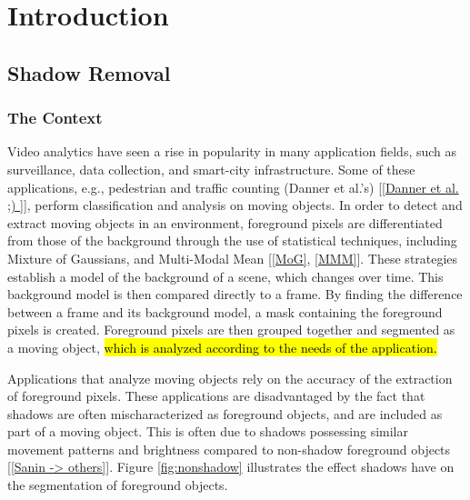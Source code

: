 \documentclass[12pt]{report}
\begin{document}
\doublespacing

\clearpage
\chapter{Introduction}

\section{Shadow Removal}

\subsection{The Context}

Video analytics have seen a rise in popularity in many application fields, such as surveillance, data collection, and smart-city infrastructure. Some of these applications, e.g., pedestrian and traffic counting (Danner et al.'s) [\ref{Danner et al. ;) }], perform classification and analysis on moving objects. In order to detect and extract moving objects in an environment, foreground pixels are differentiated from those of the background through the use of statistical techniques, including Mixture of Gaussians, and Multi-Modal Mean [\ref{MoG}, \ref{MMM}]. These strategies establish a model of the background of a scene, which changes over time. This background model is then compared directly to a frame. By finding the difference between a frame and its background model, a mask containing the foreground pixels is created. Foreground pixels are then grouped together and segmented as a moving object, \hl{which is analyzed according to the needs of the application.} 

Applications that analyze moving objects rely on the accuracy of the extraction of foreground pixels. These applications are disadvantaged by the fact that shadows are often mischaracterized as foreground objects, and are included as part of a moving object. This is often due to shadows possessing similar movement patterns and brightness compared to non-shadow foreground objects [\ref{Sanin -> others}]. Figure \ref{fig:nonshadow} illustrates the effect shadows have on the segmentation of foreground objects. 
\end{document}
